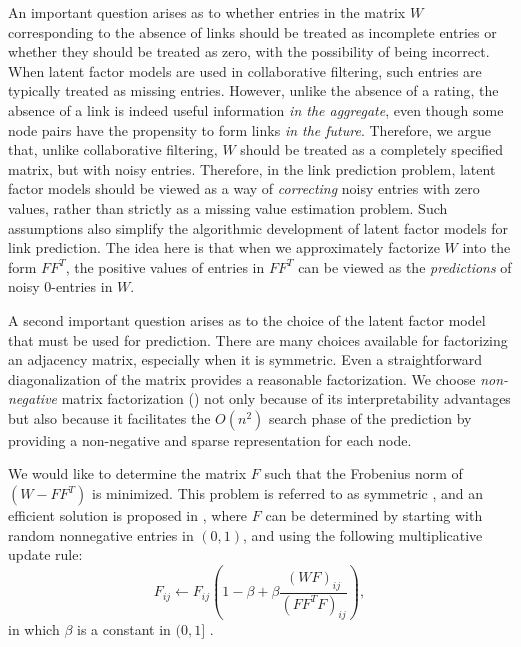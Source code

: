 An important question arises as to whether entries in the matrix $W$
corresponding to the absence of links should be treated as incomplete
entries or whether they should be treated as zero, with the possibility
of being incorrect. When latent factor models are used in
collaborative filtering, such entries are typically treated as
missing entries. However, unlike the absence of a rating, the
absence of a link is indeed useful information {\em in the
aggregate}, even though some node pairs have the propensity to form
links {\em in the future}. Therefore, we argue that, unlike
collaborative filtering, $W$ should be treated as a completely
specified matrix, but with noisy entries. Therefore, in the link
prediction problem, latent factor models should be viewed as a way
of {\em correcting} noisy entries with zero values, rather than
strictly as a missing value estimation problem.  Such assumptions
also simplify the algorithmic development of latent factor models
for link prediction. The idea here is that when we approximately
factorize $W$ into the form  $F F^T$, the positive values of entries in
$F F^T$ can be viewed as the {\em predictions} of  noisy 0-entries in
$W$.

A second important question arises as to the choice of the latent
factor model that must be used for prediction. There are many
choices available for factorizing an adjacency matrix, especially
when it is symmetric. Even a
straightforward diagonalization of the matrix provides a reasonable
factorization. We  choose {\em non-negative} matrix factorization (\NMF)
not only because of its interpretability advantages but also because
it facilitates the  $O(n^2)$ search phase of the prediction by
providing a non-negative and sparse representation for each node.

We would like to determine the matrix $F$ such that the Frobenius
norm of $( W - F F^T)$ is minimized.  This problem is referred to as
symmetric \NMF, and an efficient solution is proposed in
\cite{long}, where $F$ can be determined by starting with random
nonnegative entries in $(0, 1)$, and using the following
multiplicative update rule:
\begin{equation}
\label{equation-update}
F_{ij} \leftarrow F_{ij} \left( 1 - \beta + \beta \frac{ \left(W F \right)_{ij} }{ \left(F F^T F \right)_{ij}} \right),
\end{equation}
in which $\beta$ is a constant in $( 0, 1]$ \cite{ding}.

